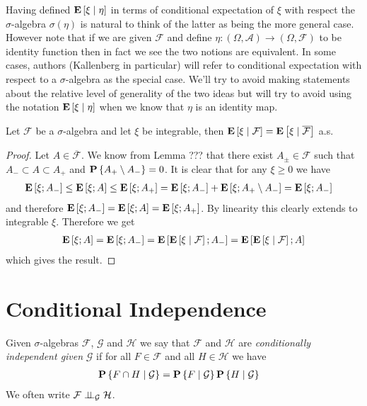 Having defined $\cexpectationlong{\eta}{\xi}$ in terms of conditional
expectation of $\xi$ with respect the $\sigma$-algebra $\sigma(\eta)$
is natural to think of the latter as being the more general case.
However note that if we are given $\mathcal{F}$ and define $\eta :
(\Omega, \mathcal{A}) \to (\Omega, \mathcal{F})$ to be identity
function then in fact we see the two notions are equivalent.  In some
cases, authors (Kallenberg in particular) will refer to conditional
expectation with respect to a $\sigma$-algebra as the special case.
We'll try to avoid making statements about the relative level of
generality of the two ideas but will try to avoid using the notation
$\cexpectationlong{\eta}{\xi}$ when we know that $\eta$ is an
identity map.

\begin{lem}\label{ConditionalExpectationCompletions}Let $\mathcal{F}$ be a $\sigma$-algebra and let $\xi$ be
  integrable, then $\cexpectationlong{\mathcal{F}}{\xi} =
  \cexpectationlong{\overline{\mathcal{F}}}{\xi}$ a.s.
\end{lem}
\begin{proof}
Let $A \in \overline{\mathcal{F}}$.  We know from Lemma ??? that there
exist $A_\pm \in \mathcal{F}$ such that $A_- \subset A \subset A_+$ and
$\probability{A_+ \setminus A_-} = 0$. It is clear that for any $\xi
\geq 0$ we have 
\begin{align*}
\expectation{\xi ; A_-} &\leq \expectation{\xi ; A} \leq
\expectation{\xi ; A_+} = \expectation{\xi; A_-} + \expectation{\xi;
  A_+ \setminus A_-} = \expectation{\xi; A_-} 
\end{align*}
and therefore $\expectation{\xi ; A_-} = \expectation{\xi; A} =
\expectation{\xi; A_+}$.  By linearity this clearly extends to
integrable $\xi$.  Therefore we get
\begin{align*}
\expectation{\xi; A} = \expectation{\xi; A_-} =
\expectation{\cexpectationlong{\mathcal{F}}{\xi}; A_-} = \expectation{\cexpectationlong{\mathcal{F}}{\xi}; A} 
\end{align*}
which gives the result.
\end{proof}

\section{Conditional Independence}

\begin{defn}Given $\sigma$-algebras $\mathcal{F}$, $\mathcal{G}$ and
  $\mathcal{H}$ we say that $\mathcal{F}$ and $\mathcal{H}$ are
  \emph{conditionally independent given} $\mathcal{G}$ if for all $F
  \in \mathcal{F}$ and all $H \in \mathcal{H}$ we have 
\begin{align*}
\cprobability{\mathcal{G}}{F \cap H} &= \cprobability{\mathcal{G}}{F} \cprobability{\mathcal{G}}{H} 
\end{align*}
We often write $\cindependent{\mathcal{F}}{\mathcal{H}}{\mathcal{G}}$.
\end{defn}

